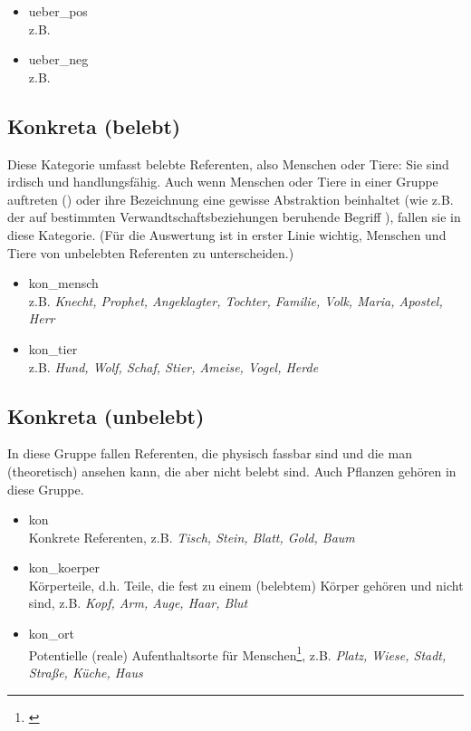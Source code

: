 {\begin{itemize}
\item ueber\_pos \\
z.B.\thinspace{}
\item ueber\_neg \\
z.B.\thinspace{}
\end{itemize}


\subsection{Konkreta (belebt)}

Diese Kategorie umfasst belebte Referenten, also Menschen oder Tiere: Sie sind
irdisch und handlungsfähig. Auch wenn Menschen oder Tiere in einer Gruppe
auftreten () oder ihre Bezeichnung eine gewisse Abstraktion
beinhaltet (wie z.B. der auf bestimmten Verwandtschaftsbeziehungen beruhende
Begriff ), fallen sie in diese Kategorie. (Für die Auswertung ist in erster Linie wichtig, Menschen und Tiere von unbelebten Referenten zu unterscheiden.)


\begin{itemize}
\item kon\_mensch \\
z.B. \textit{Knecht, Prophet, Angeklagter, Tochter, Familie, Volk, Maria, Apostel, Herr}
\item kon\_tier \\
z.B. \textit{Hund, Wolf, Schaf, Stier, Ameise, Vogel, Herde}
\end{itemize}

\subsection{Konkreta (unbelebt)}

In diese Gruppe fallen Referenten, die physisch fassbar sind und die man (theoretisch) ansehen kann, die aber nicht belebt sind. Auch Pflanzen gehören in diese Gruppe.

\begin{itemize}
\item kon \\
Konkrete Referenten, z.B. \textit{Tisch, Stein, Blatt, Gold, Baum}
\item kon\_koerper \\
Körperteile, d.h. Teile, die fest zu einem (belebtem) Körper gehören und nicht  sind, z.B. \textit{Kopf, Arm, Auge, Haar, Blut}
\item kon\_ort \\
Potentielle (reale) Aufenthaltsorte für Menschen\footnote{\textcite[s.][Abschnitt zur Belebtheitsannotation]{Garretson2010}}, z.B. \textit{Platz, Wiese, Stadt, Straße, Küche, Haus}
\end{itemize}

}
